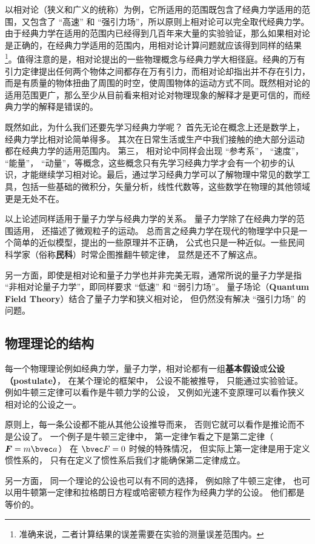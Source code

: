 以相对论（狭义和广义的统称）为例，它所适用的范围既包含了经典力学适用的范围，又包含了 “高速” 和 “强引力场”，所以原则上相对论可以完全取代经典力学。由于经典力学在适用的范围内已经得到几百年来大量的实验验证，那么如果相对论是正确的，在经典力学适用的范围内，用相对论计算问题就应该得到同样的结果\footnote{准确来说，二者计算结果的误差需要在实验的测量误差范围内。}。值得注意的是，相对论提出的一些物理概念与经典力学大相径庭。经典的万有引力定律提出任何两个物体之间都存在万有引力，而相对论却指出并不存在引力，而是有质量的物体扭曲了周围的时空，使周围物体的运动方式不同。既然相对论的适用范围更广，那么至少从目前看来相对论对物理现象的解释才是更可信的，而经典力学的解释是错误的。 

既然如此，为什么我们还要先学习经典力学呢？ 首先无论在概念上还是数学上，经典力学比相对论简单得多。 其次在日常生活或生产中我们接触的绝大部分运动都在经典力学的适用范围内。 第三， 相对论中同样会出现 “参考系”， “速度”， “能量”， “动量”，等概念，这些概念只有先学习经典力学才会有一个初步的认识，才能继续学习相对论。最后，通过学习经典力学可以了解物理中常见的数学工具，包括一些基础的微积分，矢量分析，线性代数等，这些数学在物理的其他领域更是无处不在。

以上论述同样适用于量子力学与经典力学的关系。 量子力学除了在经典力学的范围适用， 还描述了微观粒子的运动。 总而言之经典力学在现代的物理学中只是一个简单的近似模型，提出的一些原理并不正确， 公式也只是一种近似。一些民间科学家（俗称\textbf{民科}）时常企图推翻牛顿定律， 显然是还不了解这点。

另一方面，即使是相对论和量子力学也并非完美无瑕，通常所说的量子力学是指 “非相对论量子力学”，即同样要求 “低速” 和 “弱引力场”。 量子场论（\textbf{Quantum Field Theory}）结合了量子力学和狭义相对论， 但仍然没有解决 “强引力场” 的问题。

\subsection{物理理论的结构}
每一个物理理论例如经典力学，量子力学，相对论都有一组\textbf{基本假设}或\textbf{公设（postulate）}， 在某个理论的框架中， 公设不能被推导， 只能通过实验验证。 例如牛顿三定律可以看作是牛顿力学的公设， 又例如光速不变原理可以看作狭义相对论的公设之一。

原则上，每一条公设都不能从其他公设推导而来， 否则它就可以看作是推论而不是公设了。 一个例子是牛顿三定律中， 第一定律乍看之下是第二定律（$\boldsymbol F = m\bvec a$） 在 $\bvec F = 0$ 时候的特殊情况， 但实际上第一定律是用于定义惯性系的， 只有在定义了惯性系后我们才能确保第二定律成立。

另一方面， 同一个理论的公设也可以有不同的选择， 例如除了牛顿三定律， 也可以用牛顿第一定律和拉格朗日方程或哈密顿方程作为经典力学的公设。 他们都是等价的。
